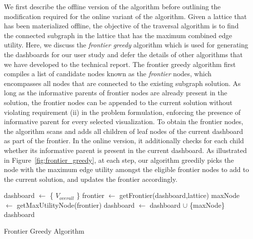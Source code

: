  We first describe the offline version of the algorithm before outlining the modification required for the online variant of the algorithm. Given a lattice that has been materialized offline, the objective of the traversal algorithm is to find the connected subgraph in the lattice that has the maximum combined edge utility. Here, we discuss the \textit{frontier greedy} algorithm which is used for generating the dashboards for our user study and defer the details of other algorithms that we have developed to the technical report. The frontier greedy algorithm first compiles a list of candidate nodes known as the \textit{frontier} nodes, which encompasses all nodes that are connected to the existing subgraph solution. As long as the informative parents of frontier nodes are already present in the solution, the frontier nodes can be appended to the current solution without violating requirement (ii) in the problem formulation, enforcing the presence of informative parent for every selected visualization. To obtain the frontier nodes, the algorithm scans and adds all children of leaf nodes of the current dashboard as part of the frontier. In the online version, it additionally checks for each child whether its informative parent is present in the current dashboard. As illustrated in Figure~\ref{fig:frontier_greedy}, at each step, our algorithm greedily picks the node with the maximum edge utility amongst the eligible frontier nodes to add to the current solution, and updates the frontier accordingly. 
\begin{algorithm}
  \begin{algorithmic}[1]
  \State dashboard $\gets$ \{ $V_{overall}$ \}
      \State frontier $\gets$ getFrontier(dashboard,lattice)
      \State maxNode $\gets$ getMaxUtilityNode(frontier)
      \State dashboard $\gets$ dashboard $\cup$ \{maxNode\}
  \EndWhile
  \Return dashboard
  \EndProcedure
  \end{algorithmic}
  \caption{Frontier Greedy Algorithm}\label{algo:frontier_greedy}
\end{algorithm}
\vspace{-15pt}
